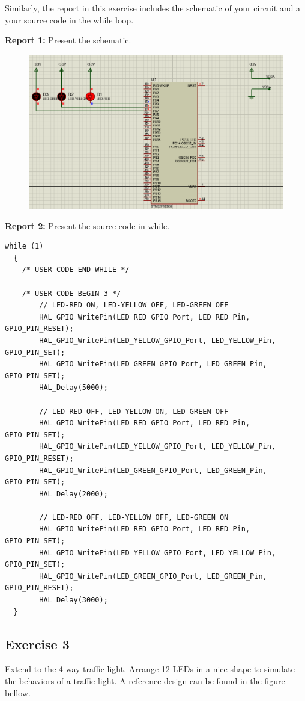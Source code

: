 Similarly, the report in this exercise includes the schematic of your circuit and a your source code in the while loop.

\textbf{Report 1: } Present the schematic.
\begin{figure}[H]
    \centering
    \includegraphics[width=5in]{source/picture/bai_1/Proteus_sche_ex2.PNG}
\end{figure}

\textbf{Report 2: } Present the source code in while.
\begin{lstlisting}[Source code for exercise 2]
  while (1)
  {
    /* USER CODE END WHILE */

    /* USER CODE BEGIN 3 */
        // LED-RED ON, LED-YELLOW OFF, LED-GREEN OFF
        HAL_GPIO_WritePin(LED_RED_GPIO_Port, LED_RED_Pin, GPIO_PIN_RESET);
        HAL_GPIO_WritePin(LED_YELLOW_GPIO_Port, LED_YELLOW_Pin, GPIO_PIN_SET);
        HAL_GPIO_WritePin(LED_GREEN_GPIO_Port, LED_GREEN_Pin, GPIO_PIN_SET);
        HAL_Delay(5000);

        // LED-RED OFF, LED-YELLOW ON, LED-GREEN OFF
        HAL_GPIO_WritePin(LED_RED_GPIO_Port, LED_RED_Pin, GPIO_PIN_SET);
        HAL_GPIO_WritePin(LED_YELLOW_GPIO_Port, LED_YELLOW_Pin, GPIO_PIN_RESET);
        HAL_GPIO_WritePin(LED_GREEN_GPIO_Port, LED_GREEN_Pin, GPIO_PIN_SET);
        HAL_Delay(2000);

        // LED-RED OFF, LED-YELLOW OFF, LED-GREEN ON
        HAL_GPIO_WritePin(LED_RED_GPIO_Port, LED_RED_Pin, GPIO_PIN_SET);
        HAL_GPIO_WritePin(LED_YELLOW_GPIO_Port, LED_YELLOW_Pin, GPIO_PIN_SET);
        HAL_GPIO_WritePin(LED_GREEN_GPIO_Port, LED_GREEN_Pin, GPIO_PIN_RESET);
        HAL_Delay(3000);
  }
\end{lstlisting}
\subsection{Exercise 3}
Extend to the 4-way traffic light. Arrange 12 LEDs in a nice shape to simulate the behaviors of a traffic light. A reference design can be found in the figure bellow.

